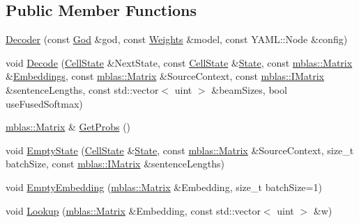 \subsection*{Public Member Functions}
\begin{DoxyCompactItemize}
\item 
\hyperlink{classamunmt_1_1GPU_1_1Decoder_a6fdd75e6878128ef9c3ccd4a6313b3d4}{Decoder} (const \hyperlink{classamunmt_1_1God}{God} \&god, const \hyperlink{structamunmt_1_1GPU_1_1Weights}{Weights} \&model, const Y\+A\+M\+L\+::\+Node \&config)
\item 
void \hyperlink{classamunmt_1_1GPU_1_1Decoder_a3a59e5ae48026807d3e95e8957bdd601}{Decode} (\hyperlink{structamunmt_1_1GPU_1_1CellState}{Cell\+State} \&Next\+State, const \hyperlink{structamunmt_1_1GPU_1_1CellState}{Cell\+State} \&\hyperlink{classamunmt_1_1State}{State}, const \hyperlink{namespaceamunmt_1_1GPU_1_1mblas_ab67821a8254de53e45a623cf73c0aef6}{mblas\+::\+Matrix} \&\hyperlink{classamunmt_1_1GPU_1_1Decoder_1_1Embeddings}{Embeddings}, const \hyperlink{namespaceamunmt_1_1GPU_1_1mblas_ab67821a8254de53e45a623cf73c0aef6}{mblas\+::\+Matrix} \&Source\+Context, const \hyperlink{namespaceamunmt_1_1GPU_1_1mblas_ad6a337d269d1833a6028b8871e57d2d0}{mblas\+::\+I\+Matrix} \&sentence\+Lengths, const std\+::vector$<$ uint $>$ \&beam\+Sizes, bool use\+Fused\+Softmax)
\item 
\hyperlink{namespaceamunmt_1_1GPU_1_1mblas_ab67821a8254de53e45a623cf73c0aef6}{mblas\+::\+Matrix} \& \hyperlink{classamunmt_1_1GPU_1_1Decoder_a1db9e3d47adbe7d0bc6cb001062f6d69}{Get\+Probs} ()
\item 
void \hyperlink{classamunmt_1_1GPU_1_1Decoder_aceca6923fb01b145c82e21c35675c54e}{Empty\+State} (\hyperlink{structamunmt_1_1GPU_1_1CellState}{Cell\+State} \&\hyperlink{classamunmt_1_1State}{State}, const \hyperlink{namespaceamunmt_1_1GPU_1_1mblas_ab67821a8254de53e45a623cf73c0aef6}{mblas\+::\+Matrix} \&Source\+Context, size\+\_\+t batch\+Size, const \hyperlink{namespaceamunmt_1_1GPU_1_1mblas_ad6a337d269d1833a6028b8871e57d2d0}{mblas\+::\+I\+Matrix} \&sentence\+Lengths)
\item 
void \hyperlink{classamunmt_1_1GPU_1_1Decoder_a801f2d13ee6d1b130ea4b46be0ba3ee3}{Empty\+Embedding} (\hyperlink{namespaceamunmt_1_1GPU_1_1mblas_ab67821a8254de53e45a623cf73c0aef6}{mblas\+::\+Matrix} \&Embedding, size\+\_\+t batch\+Size=1)
\item 
void \hyperlink{classamunmt_1_1GPU_1_1Decoder_a19ecfd6581dd0d568791eb1560b39fdb}{Lookup} (\hyperlink{namespaceamunmt_1_1GPU_1_1mblas_ab67821a8254de53e45a623cf73c0aef6}{mblas\+::\+Matrix} \&Embedding, const std\+::vector$<$ uint $>$ \&w)

\end{DoxyCompactItemize}
